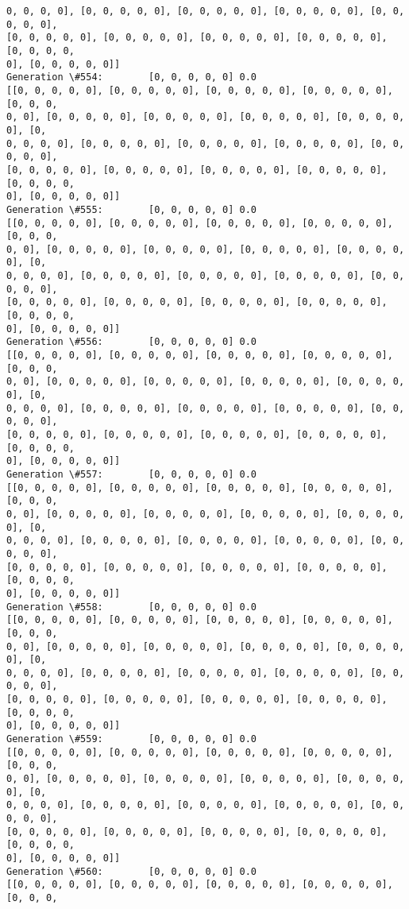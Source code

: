 \documentclass[11pt]{article}
\begin{document}
\begin{Verbatim}[commandchars=\\\{\}]
0, 0, 0, 0], [0, 0, 0, 0, 0], [0, 0, 0, 0, 0], [0, 0, 0, 0, 0], [0, 0, 0, 0, 0],
[0, 0, 0, 0, 0], [0, 0, 0, 0, 0], [0, 0, 0, 0, 0], [0, 0, 0, 0, 0], [0, 0, 0, 0,
0], [0, 0, 0, 0, 0]]
Generation \#554:        [0, 0, 0, 0, 0] 0.0
[[0, 0, 0, 0, 0], [0, 0, 0, 0, 0], [0, 0, 0, 0, 0], [0, 0, 0, 0, 0], [0, 0, 0,
0, 0], [0, 0, 0, 0, 0], [0, 0, 0, 0, 0], [0, 0, 0, 0, 0], [0, 0, 0, 0, 0], [0,
0, 0, 0, 0], [0, 0, 0, 0, 0], [0, 0, 0, 0, 0], [0, 0, 0, 0, 0], [0, 0, 0, 0, 0],
[0, 0, 0, 0, 0], [0, 0, 0, 0, 0], [0, 0, 0, 0, 0], [0, 0, 0, 0, 0], [0, 0, 0, 0,
0], [0, 0, 0, 0, 0]]
Generation \#555:        [0, 0, 0, 0, 0] 0.0
[[0, 0, 0, 0, 0], [0, 0, 0, 0, 0], [0, 0, 0, 0, 0], [0, 0, 0, 0, 0], [0, 0, 0,
0, 0], [0, 0, 0, 0, 0], [0, 0, 0, 0, 0], [0, 0, 0, 0, 0], [0, 0, 0, 0, 0], [0,
0, 0, 0, 0], [0, 0, 0, 0, 0], [0, 0, 0, 0, 0], [0, 0, 0, 0, 0], [0, 0, 0, 0, 0],
[0, 0, 0, 0, 0], [0, 0, 0, 0, 0], [0, 0, 0, 0, 0], [0, 0, 0, 0, 0], [0, 0, 0, 0,
0], [0, 0, 0, 0, 0]]
Generation \#556:        [0, 0, 0, 0, 0] 0.0
[[0, 0, 0, 0, 0], [0, 0, 0, 0, 0], [0, 0, 0, 0, 0], [0, 0, 0, 0, 0], [0, 0, 0,
0, 0], [0, 0, 0, 0, 0], [0, 0, 0, 0, 0], [0, 0, 0, 0, 0], [0, 0, 0, 0, 0], [0,
0, 0, 0, 0], [0, 0, 0, 0, 0], [0, 0, 0, 0, 0], [0, 0, 0, 0, 0], [0, 0, 0, 0, 0],
[0, 0, 0, 0, 0], [0, 0, 0, 0, 0], [0, 0, 0, 0, 0], [0, 0, 0, 0, 0], [0, 0, 0, 0,
0], [0, 0, 0, 0, 0]]
Generation \#557:        [0, 0, 0, 0, 0] 0.0
[[0, 0, 0, 0, 0], [0, 0, 0, 0, 0], [0, 0, 0, 0, 0], [0, 0, 0, 0, 0], [0, 0, 0,
0, 0], [0, 0, 0, 0, 0], [0, 0, 0, 0, 0], [0, 0, 0, 0, 0], [0, 0, 0, 0, 0], [0,
0, 0, 0, 0], [0, 0, 0, 0, 0], [0, 0, 0, 0, 0], [0, 0, 0, 0, 0], [0, 0, 0, 0, 0],
[0, 0, 0, 0, 0], [0, 0, 0, 0, 0], [0, 0, 0, 0, 0], [0, 0, 0, 0, 0], [0, 0, 0, 0,
0], [0, 0, 0, 0, 0]]
Generation \#558:        [0, 0, 0, 0, 0] 0.0
[[0, 0, 0, 0, 0], [0, 0, 0, 0, 0], [0, 0, 0, 0, 0], [0, 0, 0, 0, 0], [0, 0, 0,
0, 0], [0, 0, 0, 0, 0], [0, 0, 0, 0, 0], [0, 0, 0, 0, 0], [0, 0, 0, 0, 0], [0,
0, 0, 0, 0], [0, 0, 0, 0, 0], [0, 0, 0, 0, 0], [0, 0, 0, 0, 0], [0, 0, 0, 0, 0],
[0, 0, 0, 0, 0], [0, 0, 0, 0, 0], [0, 0, 0, 0, 0], [0, 0, 0, 0, 0], [0, 0, 0, 0,
0], [0, 0, 0, 0, 0]]
Generation \#559:        [0, 0, 0, 0, 0] 0.0
[[0, 0, 0, 0, 0], [0, 0, 0, 0, 0], [0, 0, 0, 0, 0], [0, 0, 0, 0, 0], [0, 0, 0,
0, 0], [0, 0, 0, 0, 0], [0, 0, 0, 0, 0], [0, 0, 0, 0, 0], [0, 0, 0, 0, 0], [0,
0, 0, 0, 0], [0, 0, 0, 0, 0], [0, 0, 0, 0, 0], [0, 0, 0, 0, 0], [0, 0, 0, 0, 0],
[0, 0, 0, 0, 0], [0, 0, 0, 0, 0], [0, 0, 0, 0, 0], [0, 0, 0, 0, 0], [0, 0, 0, 0,
0], [0, 0, 0, 0, 0]]
Generation \#560:        [0, 0, 0, 0, 0] 0.0
[[0, 0, 0, 0, 0], [0, 0, 0, 0, 0], [0, 0, 0, 0, 0], [0, 0, 0, 0, 0], [0, 0, 0,

\end{Verbatim}
\end{document}
